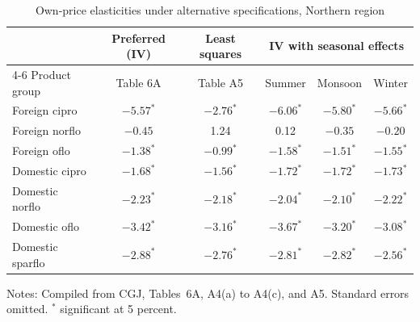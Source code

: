 \begin{table}[htbp]
\centering
\caption{Own-price elasticities under alternative specifications, Northern region}\label{tab:05-cgj-robust}
\small
\begin{tabular}{lccccc}
\toprule
 & Preferred (IV) & Least squares & \multicolumn{3}{c}{IV with seasonal effects} \\
\cmidrule(lr){4-6}
Product group & Table 6A & Table A5 & Summer & Monsoon & Winter \\
\midrule
Foreign cipro & $-5.57^{*}$ & $-2.76^{*}$ & $-6.06^{*}$ & $-5.80^{*}$ & $-5.66^{*}$ \\
Foreign norflo & $-0.45$ & 1.24 & 0.12 & $-0.35$ & $-0.20$ \\
Foreign oflo & $-1.38^{*}$ & $-0.99^{*}$ & $-1.58^{*}$ & $-1.51^{*}$ & $-1.55^{*}$ \\
Domestic cipro & $-1.68^{*}$ & $-1.56^{*}$ & $-1.72^{*}$ & $-1.72^{*}$ & $-1.73^{*}$ \\
Domestic norflo & $-2.23^{*}$ & $-2.18^{*}$ & $-2.04^{*}$ & $-2.10^{*}$ & $-2.22^{*}$ \\
Domestic oflo & $-3.42^{*}$ & $-3.16^{*}$ & $-3.67^{*}$ & $-3.20^{*}$ & $-3.08^{*}$ \\
Domestic sparflo & $-2.88^{*}$ & $-2.76^{*}$ & $-2.81^{*}$ & $-2.82^{*}$ & $-2.56^{*}$ \\
\bottomrule
\end{tabular}
\par\smallskip
\begin{minipage}{0.85\textwidth}\footnotesize
Notes: Compiled from CGJ, Tables~6A, A4(a) to A4(c), and A5. Standard errors omitted. $^{*}$ significant at 5 percent.
\end{minipage}
\end{table}

